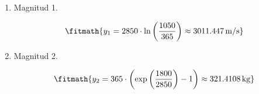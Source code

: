 \begin{enumerate}

\item Magnitud 1.

\[\fitmath{y_{1}=2850\cdot \ln\left(\frac{1050}{365}\right)\approx 3011.447\,\mathrm{m/s}}\]

\item Magnitud 2.

\[\fitmath{y_{2}=365\cdot \left(\exp\left(\frac{1800}{2850}\right)-1\right)\approx 321.4108\,\mathrm{kg}}\]

\end{enumerate}
